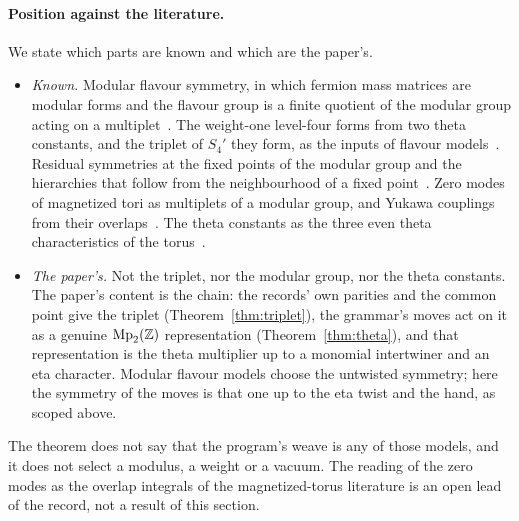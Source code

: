 \paragraph{Position against the literature.}
We state which parts are known and which are the paper's.
\begin{itemize}
\item \emph{Known.} Modular flavour symmetry, in which fermion mass matrices are modular forms and the flavour group
  is a finite quotient of the modular group acting on a multiplet~\cite{Feruglio2019}. The weight-one level-four forms
  from two theta constants, and the triplet of $S_4'$ they form, as the inputs of flavour models~\cite{NovichkovPenedoPetcov2021,LiuYaoDing2020}.
  Residual symmetries at the fixed points of the modular group and the hierarchies that follow from the neighbourhood
  of a fixed point~\cite{NovichkovPenedoPetcov2021hier}. Zero modes of magnetized tori as multiplets of a
  modular group, and Yukawa couplings from their overlaps~\cite{CremadesIbanezMarchesano2004,KobayashiTamba2019}. The
  theta constants as the three even theta characteristics of the torus~\cite{AlvarezGaumeMooreVafa1986}.
\item \emph{The paper's.} Not the triplet, nor the modular group, nor the theta constants. The paper's content is the
  chain: the records' own parities and the common point give the triplet (Theorem~\ref{thm:triplet}), the
  grammar's moves act on it as a genuine $\mathrm{Mp}_2(\mathbb{Z})$ representation (Theorem~\ref{thm:theta}), and that
  representation is the theta multiplier up to a monomial intertwiner and an eta character. Modular flavour models
  choose the untwisted symmetry; here the symmetry of the moves is that one up to the eta twist and the hand, as scoped above.
\end{itemize}
The theorem does not say that the program's weave is any of those models, and it does not select a modulus, a weight
or a vacuum. The reading of the zero modes as the overlap integrals of the magnetized-torus literature is an open lead of the
record, not a result of this section.

